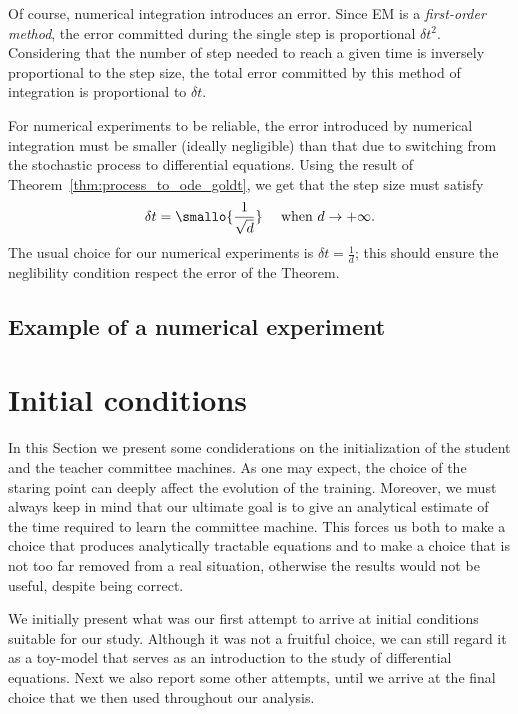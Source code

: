 Of course, numerical integration introduces an error.
Since EM is a \emph{first-order method},
the error committed during the single step is proportional \(\delta t^2\).
Considering that the number of step needed to reach a given time is inversely proportional
to the step size, the total error committed by this method of integration
is proportional to \(\delta t\).

For numerical experiments to be reliable, the error introduced by numerical integration
must be smaller (ideally negligible) than that due to switching from the stochastic process
to differential equations. Using the result of Theorem~\ref{thm:process_to_ode_goldt},
we get that the step size must satisfy
\[
  \delta t = \smallo{\frac{1}{\sqrt{d}}}\quad \text{ when }d\to+\infty.
\]
The usual choice for our numerical experiments is \(\delta t = \frac1d\);
this should ensure the neglibility condition respect the error of the Theorem.

\subsection{Example of a numerical experiment}

\section{Initial conditions}
In this Section we present some condiderations on the initialization of the student
and the teacher committee machines. As one may expect, the choice of the staring point 
can deeply affect the evolution of the training.
Moreover, we must always keep in mind that our ultimate goal is to give
an analytical estimate of the time required to learn the committee machine.
This forces us both to make a choice that produces analytically tractable equations
and to make a choice that is not too far removed from a real situation,
otherwise the results would not be useful, despite being correct.

We initially present what was our first attempt to arrive at initial conditions suitable for our study.
Although it was not a fruitful choice,
we can still regard it as a toy-model that serves as an introduction to the study of differential equations.
Next we also report some other attempts, until we arrive at the final choice that we then used throughout our analysis.

